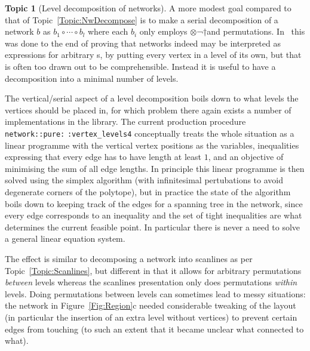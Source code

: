 \documentclass{article}
\theoremstyle{definition}
\newtheorem{topic}{Topic}
\newcommand{\PROP}{\smaller{PROP}}
\newcommand{\PROPs}{\PROP s}
\begin{document}
\begin{topic}[Level decomposition of networks] 
  \label{Topic:LevelDecompose}
  A more modest goal compared to that of 
  Topic~\ref{Topic:NwDecompose} is to make a serial decomposition of 
  a network $b$ as \(b_1 \circ \dotsb \circ b_l\) where each $b_i$ 
  only employs $\otimes$¬†and permutations. In~\cite[Sec.~4--5]{NR1} 
  this was done to the end of proving that networks indeed may be 
  interpreted as expressions for arbitrary \PROPs, by putting every 
  vertex in a level of its own, but that is often too drawn out 
  to be comprehensible. Instead it is useful to have a decomposition 
  into a minimal number of levels.
  
  The vertical\slash serial aspect of a level decomposition boils down 
  to what levels the vertices should be placed in, for which problem 
  there again exists a number of implementations in the library. The 
  current production procedure 
  \texttt{network:\discretionary{}{}{}:pure:}\discretionary{}{}{}%
  \verb|:vertex_levels4| conceptually treats the whole situation as a 
  linear programme with the vertical vertex positions as the 
  variables, inequalities expressing that every edge has to have 
  length at least $1$, and an objective of minimising the sum of all 
  edge lengths. In principle this linear programme is then solved 
  using the simplex algorithm (with infinitesimal pertubations to 
  avoid degenerate corners of the polytope), but in practice the 
  state of the algorithm boils down to keeping track of the edges for 
  a spanning tree in the network, since every edge corresponds to an 
  inequality and the set of tight inequalities are what determines 
  the current feasible point. In particular there is never a need to 
  solve a general linear equation system.
\end{topic}

The effect is similar to decomposing a network into scanlines as per 
Topic~\ref{Topic:Scanlines}, but different in that it allows for 
arbitrary permutations \emph{between} levels whereas the scanlines 
presentation only does permutations \emph{within} levels. Doing 
permutations between levels can sometimes lead to messy situations: 
the network in Figure~\ref{Fig:Region}c needed considerable tweaking 
of the layout (in particular the insertion of an extra level without 
vertices) to prevent certain edges from touching (to such an extent 
that it became unclear what connected to what).
\end{document}
